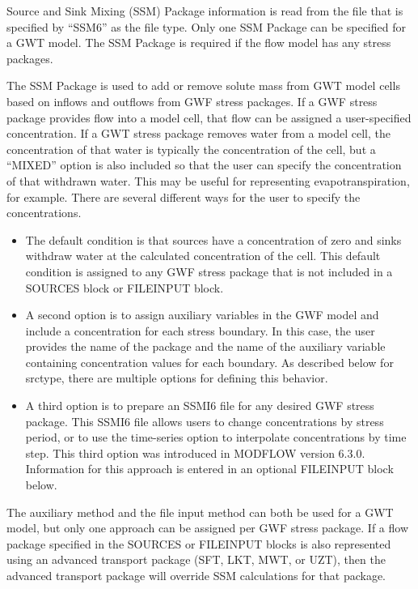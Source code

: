 Source and Sink Mixing (SSM) Package information is read from the file that is specified by ``SSM6'' as the file type.  Only one SSM Package can be specified for a GWT model.  The SSM Package is required if the flow model has any stress packages.

The SSM Package is used to add or remove solute mass from GWT model cells based on inflows and outflows from GWF stress packages.  If a GWF stress package provides flow into a model cell, that flow can be assigned a user-specified concentration.  If a GWT stress package removes water from a model cell, the concentration of that water is typically the concentration of the cell, but a ``MIXED'' option is also included so that the user can specify the concentration of that withdrawn water.  This may be useful for representing evapotranspiration, for example.  There are several different ways for the user to specify the concentrations.  

\begin{itemize}
\item The default condition is that sources have a concentration of zero and sinks withdraw water at the calculated concentration of the cell.  This default condition is assigned to any GWF stress package that is not included in a SOURCES block or FILEINPUT block.
\item A second option is to assign auxiliary variables in the GWF model and include a concentration for each stress boundary.  In this case, the user provides the name of the package and the name of the auxiliary variable containing concentration values for each boundary.  As described below for srctype, there are multiple options for defining this behavior.
\item A third option is to prepare an SSMI6 file for any desired GWF stress package.  This SSMI6 file allows users to change concentrations by stress period, or to use the time-series option to interpolate concentrations by time step.  This third option was introduced in MODFLOW version 6.3.0.  Information for this approach is entered in an optional FILEINPUT block below.
\end{itemize}

\noindent The auxiliary method and the file input method can both be used for a GWT model, but only one approach can be assigned per GWF stress package.   If a flow package specified in the SOURCES or FILEINPUT blocks is also represented using an advanced transport package (SFT, LKT, MWT, or UZT), then the advanced transport package will override SSM calculations for that package.

